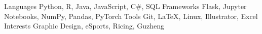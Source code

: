 
\begin{cvskills}
  \vspace{1mm}
  \cvskill
    {Languages} %
    {Python, R, Java, JavaScript, C\#, SQL} %
  \vspace{1mm}
  \cvskill
    {Frameworks} %
    {Flask, Jupyter Notebooks, NumPy, Pandas, PyTorch} %
  \vspace{1mm}
  \cvskill
    {Tools}
    {Git, LaTeX, Linux, Illustrator, Excel}
  \cvskill
    {Interests}
    {Graphic Design, eSports, Ricing, Guzheng}
\end{cvskills}
